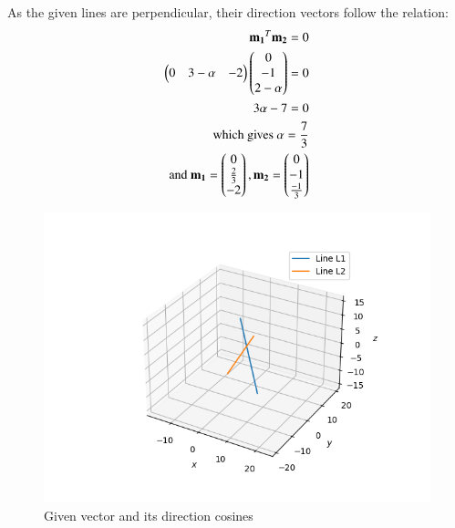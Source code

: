 \documentclass[journal]{IEEEtran}
\begin{document}
As the given lines are perpendicular, their direction vectors follow the relation: 
\begin{align}
    \mathbf{m_1}^T\mathbf{m_2} = 0 \\
    \begin{pmatrix}0&3-\alpha&-2\end{pmatrix}\begin{pmatrix}0\\-1\\2-\alpha\end{pmatrix} = 0\\
    3\alpha - 7 = 0\\
    \text{which gives } \alpha = \frac{7}{3}\\
    \text{and } \mathbf{m_1} = \begin{pmatrix}0 \\ \frac{2}{3} \\ -2\end{pmatrix} , \mathbf{m_2} = \begin{pmatrix}0 \\ -1 \\ \frac{-1}{3}\end{pmatrix}
\end{align}
\begin{figure}[H]
   \centering
  \includegraphics[width=0.64\columnwidth]{figs/fig.png}
   \caption{Given vector and its direction cosines}
   \label{stemplot}
\end{figure}
\end{document}
